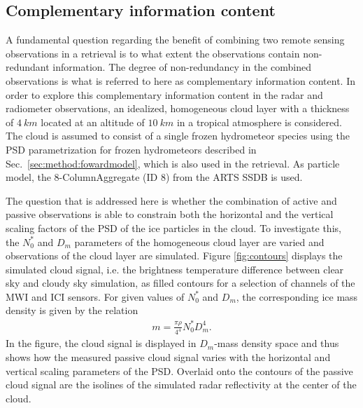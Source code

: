 \documentclass[journal abbreviation, manuscript]{copernicus}
\begin{document}
\subsection{Complementary information content}
\label{sec:simple_cloud}

A fundamental question regarding the benefit of combining two remote sensing
observations in a retrieval is to what extent the observations contain
non-redundant information. The degree of non-redundancy in the combined
observations is what is referred to here as complementary information content.
In order to explore this complementary information content in the radar and
radiometer observations, an idealized, homogeneous cloud layer with a thickness
of $4\ \unit{km}$ located at an altitude of $10\ \unit{km}$ in a tropical
atmosphere is considered. The cloud is assumed to consist of a single frozen
hydrometeor species using the PSD parametrization for frozen hydrometeors
described in Sec.~\ref{sec:method:fowardmodel}, which is also used in the
retrieval. As particle model, the 8-ColumnAggregate (ID 8) from the ARTS SSDB is
used.

The question that is addressed here is whether the combination of active
and passive observations is able to constrain both the horizontal and the
vertical scaling factors of the PSD of the ice particles in the cloud. To
investigate this, the $N_0^*$ and $D_m$ parameters of the homogeneous cloud
layer are varied and observations of the cloud layer are simulated. Figure
\ref{fig:contours} displays the simulated cloud signal, i.e. the brightness
temperature difference between clear sky and cloudy sky simulation, as filled
contours for a selection of channels of the MWI and ICI sensors. For given
values of $N_0^*$ and $D_m$, the corresponding ice mass density is given by
the relation
\begin{align}
m = \frac{\pi \rho}{4 ^ 4}N_0^* D_m^4.
\end{align}
In the figure, the cloud signal is displayed in $D_m$-mass density space and
thus shows how the measured passive cloud signal varies with the horizontal and
vertical scaling parameters of the PSD. Overlaid onto the contours of the
passive cloud signal are the isolines of the simulated radar reflectivity at the
center of the cloud.
\end{document}
